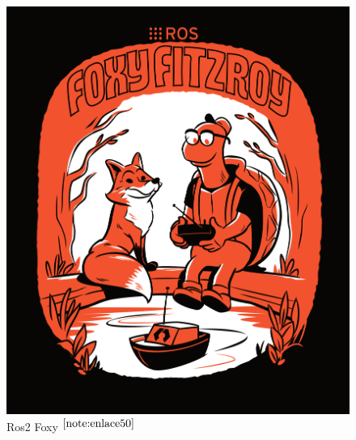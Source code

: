 \begin{figure}[ht!]
	\centering
	\begin{minipage}{0.35\linewidth}
		\centering
		\includegraphics[width=\linewidth]{figs/foxy.png}
		\caption*{\centering Ros2 Foxy $^{\ref{note:enlace50}}$} %
	\end{minipage}
	\hspace{2cm}
	\begin{minipage}{0.35\linewidth}
		\centering

\end{minipage}
\end{figure}
